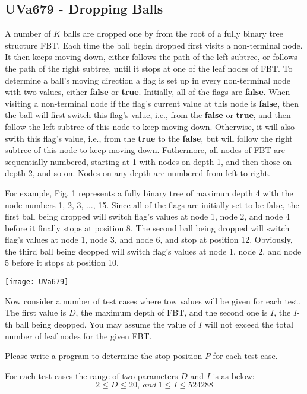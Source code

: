 \graphicspath{{CPE/Star2/image/}}
\subsection{UVa679 - Dropping Balls}
A number of $K$ balls are dropped one by from the root of a fully binary tree structure FBT. Each time the ball begin dropped first visits a non-terminal node. It then keeps moving down, either follows the path of the left subtree, or follows the path of the right subtree, until it stops at one of the leaf nodes of FBT. To determine a ball's moving direction a flag is set up in every non-terminal node with two values, either \textbf{false} or \textbf{true}. Initially, all of the flags are \textbf{false}. When visiting a non-terminal node if the flag's current value at this node is \textbf{false}, then the ball will first switch this flag's value, i.e., from the \textbf{false} or \textbf{true}, and then follow the left subtree of this node to keep moving down. Otherwise, it will also swith this flag's value, i.e., from the \textbf{true} to the \textbf{false}, but will follow the right subtree of this node to keep moving down. Futhermore, all nodes of FBT are sequentially numbered, starting at 1 with nodes on depth 1, and then those on depth 2, and so on. Nodes on any depth are numbered from left to right.

For example, Fig. 1 represents a fully binary tree of maximun depth 4 with the node numbers 1, 2, 3, ..., 15. Since all of the flags are initially set to be false, the first ball being dropped will switch flag's values at node 1, node 2, and node 4 before it finally stops at position 8. The second ball being dropped will switch flag's values at node 1, node 3, and node 6, and stop at position 12. Obviously, the third ball being deopped will switch flag's values at node 1, node 2, and node 5 before it stops at position 10.

\texttt{[image: UVa679]}

Now consider a number of test cases where tow values will be given for each test. The first value is $D$, the maximum depth of FBT, and the second one is $I$, the $I$-th ball being deopped. You may assume the value of $I$ will not exceed the total number of leaf nodes for the given FBT.

Please write a program to determine the stop position $P$ for each test case.

For each test cases the range of two parameters $D$ and $I$ is as below:
\[ 2 \leq  D \leq 20 , \ and \ 1 \leq I \leq 524288  \]

